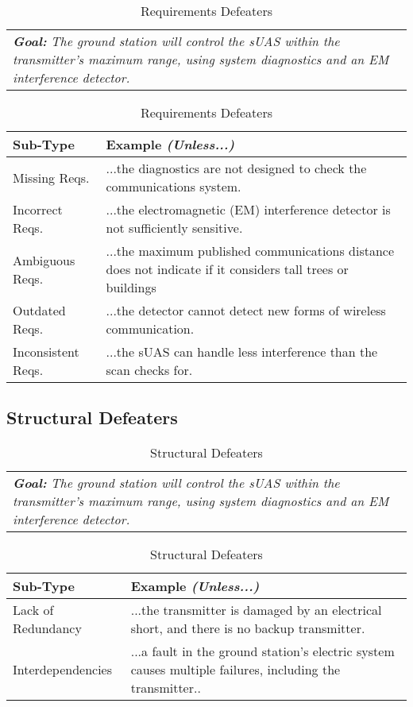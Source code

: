 \begin{table}[ht]
\centering
\caption{Requirements Defeaters}
\begin{tabularx}{\linewidth}{@{} X }
\toprule
\textit{\textbf{Goal:}} \textit{The ground station will control the sUAS within the transmitter's maximum range, using system diagnostics and an EM interference detector.} \\
\end{tabularx}

\begin{tabularx}{\linewidth}{@{} l X }
\toprule
\textbf{Sub-Type} & \textbf{Example \textit{(Unless...)}} \\
\midrule
Missing Reqs. & ...the diagnostics are not designed to check the communications system. \\
Incorrect Reqs. & ...the electromagnetic (EM) interference detector is not sufficiently sensitive. \\ 
Ambiguous Reqs. & ...the maximum published communications distance does not indicate if it considers tall trees or buildings 
\\
Outdated Reqs. & ...the detector cannot detect new forms of wireless communication.\\
Inconsistent Reqs. & ...the sUAS can handle less interference than the scan checks for.\\
\bottomrule
\end{tabularx}
\label{tab:requirements_defeaters}
\end{table}

\subsection{Structural Defeaters} 

\begin{table}[ht]
\centering
\caption{Structural Defeaters}
\begin{tabularx}{\linewidth}{ @{} X }
\toprule
 \textit{\textbf{Goal:}} \textit{The ground station will control the sUAS within the transmitter's maximum range, using system diagnostics and an EM interference detector.} \\
\end{tabularx}

\begin{tabularx}{\linewidth}{@{} l X }
\toprule
\textbf{Sub-Type} & \textbf{Example \textit{(Unless...)}} \\
\midrule
Lack of Redundancy & ...the transmitter is damaged by an electrical short, and there is no backup transmitter. \\
Interdependencies & ...a fault in the ground station's electric system causes multiple failures, including the transmitter.. \\
\bottomrule
\end{tabularx}
\label{tab:structural_defeaters}
\end{table}

